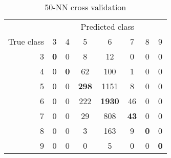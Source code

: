 \documentclass{report}
\begin{document}
\begin{table}
\centering
\begin{tabular}{r | *{7}{c}}
& \multicolumn{7}{c}{Predicted class} \\
True class & 3&4&5&6&7&8&9 \\
\hline
3 & \textbf{0}&0&8&12&0&0&0 \\
4 & 0&\textbf{0}&62&100&1&0&0 \\
5 & 0&0&\textbf{298}&1151&8&0&0 \\
6 & 0&0&222&\textbf{1930}&46&0&0 \\
7 & 0&0&29&808&\textbf{43}&0&0 \\
8 & 0&0&3&163&9&\textbf{0}&0 \\
9 & 0&0&0&5&0&0&\textbf{0} \\
\end{tabular}
\caption{50-NN cross validation}
\end{table}
\end{document}
